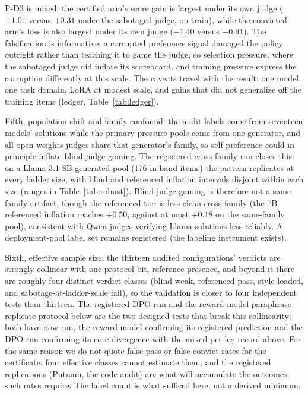 P-D3 is mixed: the certified arm's score gain is largest under its own judge ($+1.01$ versus $+0.31$ under the sabotaged judge, on train), while the convicted arm's loss is also largest under its own judge ($-1.40$ versus $-0.91$).
The falsification is informative: a corrupted preference signal damaged the policy outright rather than teaching it to game the judge, so selection pressure, where the sabotaged judge did inflate its scoreboard, and training pressure express the corruption differently at this scale.
The caveats travel with the result: one model, one task domain, LoRA at modest scale, and gains that did not generalize off the training items (ledger, Table~\ref{tab:ledger}).

Fifth, population shift and family confound: the audit labels come from seventeen models' solutions while the primary pressure pools come from one generator, and all open-weights judges share that generator's family, so self-preference could in principle inflate blind-judge gaming.
The registered cross-family run closes this: on a Llama-3.1-8B-generated pool (176 in-band items) the pattern replicates at every ladder size, with blind and referenced inflation intervals disjoint within each size (ranges in Table~\ref{tab:robust}).
Blind-judge gaming is therefore not a same-family artifact, though the referenced tier is less clean cross-family (the 7B referenced inflation reaches $+0.50$, against at most $+0.18$ on the same-family pool), consistent with Qwen judges verifying Llama solutions less reliably.
A deployment-pool label set remains registered (the labeling instrument exists).

Sixth, effective sample size: the thirteen audited configurations' verdicts are strongly collinear with one protocol bit, reference presence, and beyond it there are roughly four distinct verdict classes (blind-weak, referenced-pass, style-loaded, and sabotage-at-ladder-scale fail), so the validation is closer to four independent tests than thirteen.
The registered DPO run and the reward-model paraphrase-replicate protocol below are the two designed tests that break this collinearity; both have now run, the reward model confirming its registered prediction and the DPO run confirming its core divergence with the mixed per-leg record above.
For the same reason we do not quote false-pass or false-convict rates for the certificate: four effective classes cannot estimate them, and the registered replications (Putnam, the code audit) are what will accumulate the outcomes such rates require.
The label count is what sufficed here, not a derived minimum.


